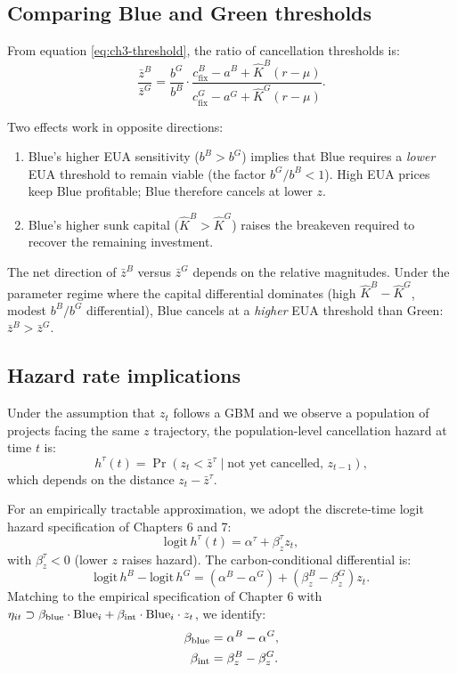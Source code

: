 \subsection{Comparing Blue and Green thresholds}

From equation \eqref{eq:ch3-threshold}, the ratio of cancellation thresholds is:
\begin{equation}
\frac{\bar{z}^B}{\bar{z}^G} = \frac{b^G}{b^B} \cdot \frac{c^{B}_{\mathrm{fix}} - a^B + \hat{K}^B(r - \mu)}{c^{G}_{\mathrm{fix}} - a^G + \hat{K}^G(r - \mu)}.
\end{equation}

Two effects work in opposite directions:
\begin{enumerate}
    \item Blue's higher EUA sensitivity ($b^B > b^G$) implies that Blue requires a \textit{lower} EUA threshold to remain viable (the factor $b^G/b^B < 1$). High EUA prices keep Blue profitable; Blue therefore cancels at lower $z$.
    \item Blue's higher sunk capital ($\hat{K}^B > \hat{K}^G$) raises the breakeven required to recover the remaining investment.
\end{enumerate}
The net direction of $\bar{z}^B$ versus $\bar{z}^G$ depends on the relative magnitudes. Under the parameter regime where the capital differential dominates (high $\hat{K}^B - \hat{K}^G$, modest $b^B/b^G$ differential), Blue cancels at a \textit{higher} EUA threshold than Green: $\bar{z}^B > \bar{z}^G$.

\subsection{Hazard rate implications}

Under the assumption that $z_t$ follows a GBM and we observe a population of projects facing the same $z$ trajectory, the population-level cancellation hazard at time $t$ is:
\begin{equation}
h^{\tau}(t) = \Pr(z_t < \bar{z}^{\tau} \mid \text{not yet cancelled, } z_{t-1}),
\end{equation}
which depends on the distance $z_t - \bar{z}^{\tau}$.

For an empirically tractable approximation, we adopt the discrete-time logit hazard specification of Chapters 6 and 7:
\begin{equation}
\mathrm{logit}\, h^{\tau}(t) = \alpha^{\tau} + \beta_z^{\tau} z_t,
\end{equation}
with $\beta_z^{\tau} < 0$ (lower $z$ raises hazard). The carbon-conditional differential is:
\begin{equation}
\mathrm{logit}\, h^B - \mathrm{logit}\, h^G = (\alpha^B - \alpha^G) + (\beta_z^B - \beta_z^G) z_t.
\end{equation}
Matching to the empirical specification of Chapter 6 with $\eta_{it} \supset \beta_{\mathrm{blue}} \cdot \mathrm{Blue}_i + \beta_{\mathrm{int}} \cdot \mathrm{Blue}_i \cdot z_t$, we identify:
\begin{align}
\beta_{\mathrm{blue}} &= \alpha^B - \alpha^G, \\
\beta_{\mathrm{int}} &= \beta_z^B - \beta_z^G.
\end{align}

